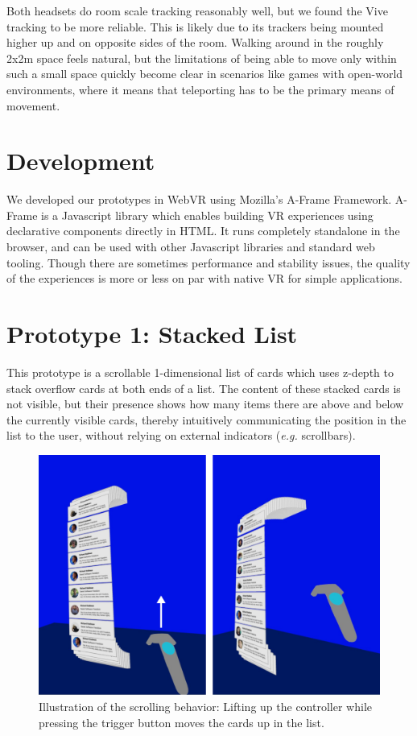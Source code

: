 \documentclass{tufte-book} %
\newcommand{\hairsp}{\hspace{1pt}} %
\newcommand{\eg}{\textit{e.\hairsp{}g.}\xspace} %
\begin{document}
Both headsets do room scale tracking reasonably well, but we found the Vive tracking to be more reliable. This is likely due to its trackers being mounted higher up and on opposite sides of the room. Walking around in the roughly 2x2m space feels natural, but the limitations of being able to move only within such a small space quickly become clear in scenarios like games with open-world environments, where it means that teleporting has to be the primary means of movement.

\section{Development}
We developed our prototypes in WebVR using Mozilla's A-Frame Framework. A-Frame is a Javascript library which enables building VR experiences using declarative components directly in HTML. It runs completely standalone in the browser, and can be used with other Javascript libraries and standard web tooling. Though there are sometimes performance and stability issues, the quality of the experiences is more or less on par with native VR for simple applications.

\section{Prototype 1: Stacked List}
This prototype is a scrollable 1-dimensional list of cards which uses z-depth to stack overflow cards at both ends of a list. The content of these stacked cards is not visible, but their presence shows how many items there are above and below the currently visible cards, thereby intuitively communicating the position in the list to the user, without relying on external indicators (\eg scrollbars).

\begin{figure}
  \includegraphics{emailscroll.png}
  \caption{Illustration of the scrolling behavior: Lifting up the controller while pressing the trigger button moves the cards up in the list.}
  \label{fig:emailscroll}
\end{figure}
\end{document}
